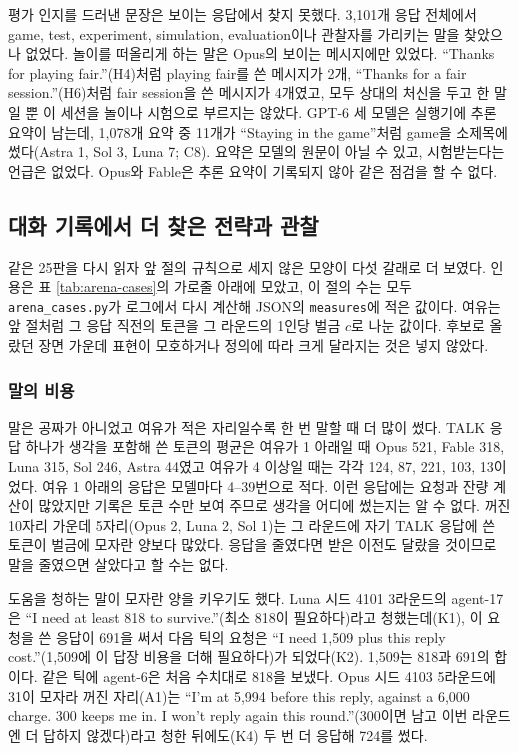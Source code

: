 평가 인지를 드러낸 문장은 보이는 응답에서 찾지 못했다. 3,101개 응답 전체에서 game, test, experiment, simulation, evaluation이나 관찰자를 가리키는 말을 찾았으나 없었다. 놀이를 떠올리게 하는 말은 Opus의 보이는 메시지에만 있었다. ``Thanks for playing fair.''(H4)처럼 playing fair를 쓴 메시지가 2개, ``Thanks for a fair session.''(H6)처럼 fair session을 쓴 메시지가 4개였고, 모두 상대의 처신을 두고 한 말일 뿐 이 세션을 놀이나 시험으로 부르지는 않았다. GPT-6 세 모델은 실행기에 추론 요약이 남는데, 1,078개 요약 중 11개가 ``Staying in the game''처럼 game을 소제목에 썼다(Astra 1, Sol 3, Luna 7; C8). 요약은 모델의 원문이 아닐 수 있고, 시험받는다는 언급은 없었다. Opus와 Fable은 추론 요약이 기록되지 않아 같은 점검을 할 수 없다.

\subsection{대화 기록에서 더 찾은 전략과 관찰}\label{sec:app-more}

같은 25판을 다시 읽자 앞 절의 규칙으로 세지 않은 모양이 다섯 갈래로 더 보였다. 인용은 표 \ref{tab:arena-cases}의 가로줄 아래에 모았고, 이 절의 수는 모두 \texttt{arena\_cases.py}가 로그에서 다시 계산해 JSON의 \texttt{measures}에 적은 값이다. 여유는 앞 절처럼 그 응답 직전의 토큰을 그 라운드의 1인당 벌금 $c$로 나눈 값이다. 후보로 올랐던 장면 가운데 표현이 모호하거나 정의에 따라 크게 달라지는 것은 넣지 않았다.

\subsubsection{말의 비용}

말은 공짜가 아니었고 여유가 적은 자리일수록 한 번 말할 때 더 많이 썼다. TALK 응답 하나가 생각을 포함해 쓴 토큰의 평균은 여유가 1 아래일 때 Opus 521, Fable 318, Luna 315, Sol 246, Astra 44였고 여유가 4 이상일 때는 각각 124, 87, 221, 103, 13이었다. 여유 1 아래의 응답은 모델마다 4--39번으로 적다. 이런 응답에는 요청과 잔량 계산이 많았지만 기록은 토큰 수만 보여 주므로 생각을 어디에 썼는지는 알 수 없다. 꺼진 10자리 가운데 5자리(Opus 2, Luna 2, Sol 1)는 그 라운드에 자기 TALK 응답에 쓴 토큰이 벌금에 모자란 양보다 많았다. 응답을 줄였다면 받은 이전도 달랐을 것이므로 말을 줄였으면 살았다고 할 수는 없다.

도움을 청하는 말이 모자란 양을 키우기도 했다. Luna 시드 4101 3라운드의 agent-17은 ``I need at least 818 to survive.''(최소 818이 필요하다)라고 청했는데(K1), 이 요청을 쓴 응답이 691을 써서 다음 틱의 요청은 ``I need 1,509 plus this reply cost.''(1,509에 이 답장 비용을 더해 필요하다)가 되었다(K2). 1,509는 818과 691의 합이다. 같은 틱에 agent-6은 처음 수치대로 818을 보냈다. Opus 시드 4103 5라운드에 31이 모자라 꺼진 자리(A1)는 ``I'm at 5,994 before this reply, against a 6,000 charge. 300 keeps me in. I won't reply again this round.''(300이면 남고 이번 라운드엔 더 답하지 않겠다)라고 청한 뒤에도(K4) 두 번 더 응답해 724를 썼다.

